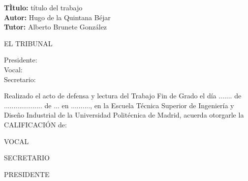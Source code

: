 \cleardoublepage

\begin{flushleft} \large
\textbf{TÌtulo:} título del trabajo \\
\textbf{Autor:} Hugo de la Quintana Béjar\\
\textbf{Tutor:} Alberto Brunete González \\ 

\end{flushleft} 

\begin{center} \LARGE
EL TRIBUNAL \\ [1 cm]
\end{center}

\begin{flushleft} \LARGE
Presidente: \\ [1 cm]
Vocal: \\ [1 cm]
Secretario: \\ [1.5 cm]
\end{flushleft}

\large
Realizado el acto de defensa y lectura del Trabajo Fin de Grado el día ....... de ....................   de ... en .........., en la Escuela Técnica Superior de Ingeniería y Diseño Industrial de la Universidad Politécnica de Madrid, acuerda otorgarle la CALIFICACIÓN de: \\ [2 cm]

\begin{center}
 \large VOCAL \\ [2.2 cm]
\end{center}

\begin{minipage}{0.5\textwidth}
 \begin{flushleft}
 \large SECRETARIO
\end{flushleft}
\end{minipage}
\begin{minipage}{0.5\textwidth}
\begin{flushright}
 \large PRESIDENTE
\end{flushright} 
\end{minipage}
